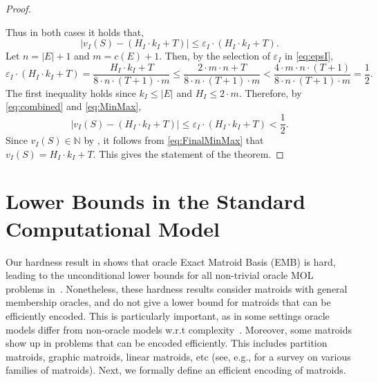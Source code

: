\documentclass[11pt,letter]{article}
\newcommand{\eps}{{\varepsilon}}
\begin{document}
\begin{proof}
\begin{enumerate}
	\end{enumerate} 
	Thus in both cases it holds that, 
	\begin{equation}
		\label{eq:combined}
		\left|	v_I(S)-\left(H_I \cdot k_I+T\right) \right|	\leq 	\eps_I \cdot \left(H_I \cdot k_I+T\right). 
	\end{equation}
	Let $n = |E|+1$ and $m = c(E)+1$. Then, by the selection of $\eps_I$ in \eqref{eq:epsI}, 
	\begin{equation}
		\label{eq:MinMax}
		\eps_I \cdot \left(H_I \cdot k_I+T\right) = \frac{H_I \cdot k_I+T}{8 \cdot n \cdot (T+1) \cdot m} 
		\leq\frac{2 \cdot m \cdot n + T}{8 \cdot n \cdot (T+1) \cdot m} 
		<\frac{4 \cdot m \cdot n \cdot (T+1)}{8 \cdot n \cdot (T+1) \cdot m} 
		= \frac{1}{2}. 
	\end{equation}
The first inequality holds since $k_I \leq |E|$ and $H_I \leq 2 \cdot m$.	Therefore, by \eqref{eq:combined} and \eqref{eq:MinMax}, 
	\begin{equation}
		\label{eq:FinalMinMax}
		  \left|	v_I(S)-\left(H_I \cdot k_I+T\right) \right|	\leq 	\eps_I \cdot \left(H_I \cdot k_I+T\right) <  \frac{1}{2}.
	\end{equation} Since $v_I(S) \in \mathbb{N}$ by , it follows from \eqref{eq:FinalMinMax} that $v_I(S) = H_I \cdot k_I+T$. This gives
	the statement of the theorem. 
\end{proof}
   		    
	
\section{Lower Bounds in the Standard Computational Model}
\label{sec:SAT}
Our hardness result in  shows that {\sc oracle Exact Matroid Basis (EMB)} is hard, leading to the unconditional lower bounds for all non-trivial oracle MOL problems in~. Nonetheless, these hardness results consider matroids with general membership oracles, and do not give a lower bound for matroids that can be efficiently encoded. This is particularly important, as in some settings oracle models differ from non-oracle models w.r.t complexity~\cite{canetti2004random,chang1994random}. Moreover, some matroids show up in problems that can be encoded efficiently.
 This includes partition matroids, graphic matroids, linear matroids, etc (see, e.g., \cite{Sc03} for a survey on various families of matroids). Next, we formally define an efficient encoding of matroids.
	
\end{document}

